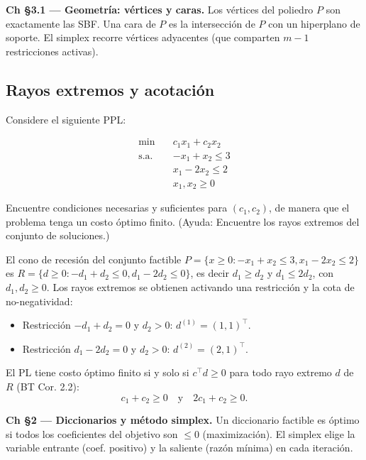 \documentclass[12pt]{article}
\theoremstyle{plain}
\begin{document}
\begin{teofund}
\textbf{Ch §3.1 — Geometría: vértices y caras.} Los vértices del poliedro $P$ son exactamente las SBF. Una cara de $P$ es la intersección de $P$ con un hiperplano de soporte. El simplex recorre vértices adyacentes (que comparten $m-1$ restricciones activas).
\end{teofund}

\bigskip

\subsection{Rayos extremos y acotación}

Considere el siguiente PPL:

\[
      \begin{aligned}
            \min\quad        & c_1 x_1 + c_2 x_2 \\
            \text{s.a.}\quad & -x_1 + x_2 \leq 3 \\
                             & x_1 - 2x_2 \leq 2  \\
                             & x_1, x_2 \geq 0
      \end{aligned}
\]

Encuentre condiciones necesarias y suficientes para $(c_1, c_2)$, de manera que el problema
tenga un costo óptimo finito. (Ayuda: Encuentre los rayos extremos del conjunto de
soluciones.)

\begin{solucion}

El cono de recesión del conjunto factible $P = \{x \geq 0 : -x_1+x_2 \leq 3, x_1-2x_2 \leq 2\}$ es $R = \{d \geq 0 : -d_1+d_2 \leq 0, d_1-2d_2 \leq 0\}$, es decir $d_1 \geq d_2$ y $d_1 \leq 2d_2$, con $d_1,d_2 \geq 0$. Los rayos extremos se obtienen activando una restricción y la cota de no-negatividad:
\begin{itemize}
      \item Restricción $-d_1+d_2=0$ y $d_2>0$: $d^{(1)} = (1,1)^\top$.
      \item Restricción $d_1-2d_2=0$ y $d_2>0$: $d^{(2)} = (2,1)^\top$.
\end{itemize}
El PL tiene costo óptimo finito si y solo si $c^\top d \geq 0$ para todo rayo extremo $d$ de $R$ (BT Cor. 2.2):
\[
c_1 + c_2 \geq 0 \quad \text{y} \quad 2c_1 + c_2 \geq 0.
\]

\end{solucion}

\begin{teofund}
\textbf{Ch §2 — Diccionarios y método simplex.} Un diccionario factible es óptimo si todos los coeficientes del objetivo son $\leq 0$ (maximización). El simplex elige la variable entrante (coef. positivo) y la saliente (razón mínima) en cada iteración.
\end{teofund}
\end{document}

